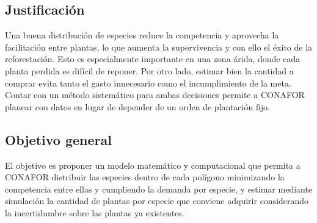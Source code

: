 \subsection{Justificación}
Una buena distribución de especies reduce la competencia y aprovecha la facilitación entre plantas, lo que aumenta la supervivencia y con ello el éxito de la reforestación. Esto es especialmente importante en una zona árida, donde cada planta perdida es difícil de reponer. Por otro lado, estimar bien la cantidad a comprar evita tanto el gasto innecesario como el incumplimiento de la meta. Contar con un método sistemático para ambas decisiones permite a CONAFOR planear con datos en lugar de depender de un orden de plantación fijo.
 
\subsection{Objetivo general}
El objetivo es proponer un modelo matemático y computacional que permita a CONAFOR distribuir las especies dentro de cada polígono minimizando la competencia entre ellas y cumpliendo la demanda por especie, y estimar mediante simulación la cantidad de plantas por especie que conviene adquirir considerando la incertidumbre sobre las plantas ya existentes.